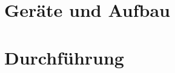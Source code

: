 \section{Geräte und Aufbau}
\label{sec:aufbau}





\section{Durchführung}
\label{sec:durch}












